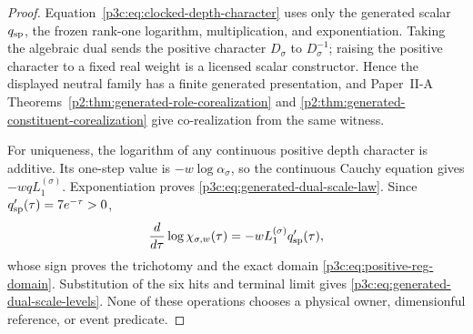 \documentclass[12pt,a4paper]{article}
\begin{document}
\begin{proof}
Equation~\eqref{p3c:eq:clocked-depth-character} uses only the generated scalar
\(q_{\rm sp}\), the frozen rank-one logarithm, multiplication, and
exponentiation.  Taking the algebraic dual sends the positive character
\(D_\sigma\) to \(D_\sigma^{-1}\); raising the positive character to a fixed
real weight is a licensed scalar constructor.  Hence the displayed neutral
family has a finite generated presentation, and Paper~II-A
Theorems~\ref{p2:thm:generated-role-corealization} and
\ref{p2:thm:generated-constituent-corealization} give co-realization from the
same witness.

For uniqueness, the logarithm of any continuous positive depth character is
additive.  Its one-step value is \(-w\log\alpha_\sigma\), so the continuous
Cauchy equation gives \(-wqL_1^{(\sigma)}\).  Exponentiation proves
\eqref{p3c:eq:generated-dual-scale-law}.  Since
\(q_{\rm sp}'(\tau)=7e^{-\tau}>0\),
\[
 \frac{d}{d\tau}\log\chi_{\sigma,w}(\tau)
 =-wL_1^{(\sigma)}q_{\rm sp}'(\tau),
\]
whose sign proves the trichotomy and the exact domain
\eqref{p3c:eq:positive-reg-domain}.  Substitution of the six hits and terminal
limit gives \eqref{p3c:eq:generated-dual-scale-levels}.  None of these
operations chooses a physical owner, dimensionful reference, or event
predicate.
\end{proof}
\end{document}

